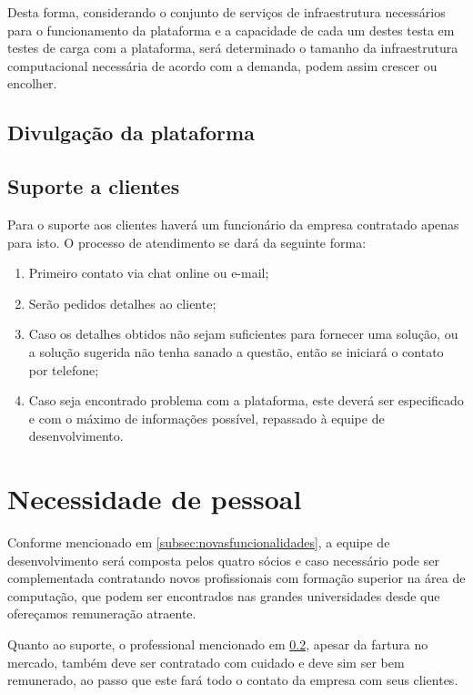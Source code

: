   Desta forma, considerando o conjunto de serviços de infraestrutura necessários para o funcionamento da plataforma e a capacidade de cada um destes testa em testes de carga com a plataforma, será determinado o tamanho da infraestrutura computacional necessária de acordo com a demanda, podem assim crescer ou encolher.
  
  \subsection{Divulgação da plataforma}
  
  \subsection{Suporte a clientes}\label{subsec:suporte}
  Para o suporte aos clientes haverá um funcionário da empresa contratado apenas para isto. O processo de atendimento se dará da seguinte forma:
  
  \begin{enumerate}
    \item Primeiro contato via chat online ou e-mail;
    \item Serão pedidos detalhes ao cliente;
    \item Caso os detalhes obtidos não sejam suficientes para fornecer uma solução, ou a solução sugerida não tenha sanado a questão, então se iniciará o contato por telefone;
    \item Caso seja encontrado problema com a plataforma, este deverá ser especificado e com o máximo de informações possível, repassado à equipe de desenvolvimento.
  \end{enumerate}
  
\section{Necessidade de pessoal}
Conforme mencionado em \ref{subsec:novasfuncionalidades}, a equipe de desenvolvimento será composta pelos quatro sócios e caso necessário pode ser complementada contratando novos profissionais com formação superior na área de computação, que podem ser encontrados nas grandes universidades desde que ofereçamos remuneração atraente.

Quanto ao suporte, o professional mencionado em \ref{subsec:suporte}, apesar da fartura no mercado, também deve ser contratado com cuidado e deve sim ser bem remunerado, ao passo que este fará todo o contato da empresa com seus clientes.
